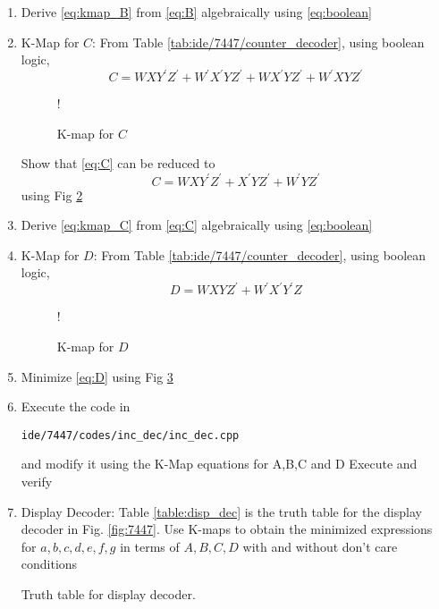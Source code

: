 \begin{enumerate}[label=\arabic*.,ref=\theenumi]
\begin{equation}
\end{equation}
%
\begin{figure}[H]
\resizebox {\columnwidth} {!} {

}
\caption{K-map for $B$}
\label{fig:kmap_B}
\end{figure}
%
Show that \eqref{eq:B} can be reduced to
\begin{equation}
\label{eq:kmap_B}
B = WX^{\prime}Z^{\prime} + W^{\prime}XZ^{\prime}
\end{equation}
using Fig \ref{fig:kmap_B}
\item Derive \eqref{eq:kmap_B} from \eqref{eq:B} algebraically using \eqref{eq:boolean}
%
%
\item {K-Map for $C$: }
From Table \ref{tab:ide/7447/counter_decoder}, using boolean logic,
\begin{equation}
\label{eq:C}
C = WXY^{\prime}Z^{\prime} + W^{\prime}X^{\prime}YZ^{\prime}
+WX^{\prime}YZ^{\prime}
+W^{\prime}XYZ^{\prime}
\end{equation}
%
%
\begin{figure}[H]
\resizebox {\columnwidth} {!} {

}
\caption{K-map for $C$}
\label{fig:kmap_C}
\end{figure}
%
Show that \eqref{eq:C} can be reduced to
\begin{equation}
\label{eq:kmap_C}
C = WXY^{\prime}Z^{\prime}  +  X^{\prime}YZ^{\prime} + W^{\prime}YZ^{\prime}
\end{equation}
using Fig \ref{fig:kmap_C}
%
\item 
Derive \eqref{eq:kmap_C} from \eqref{eq:C} algebraically using \eqref{eq:boolean}
%
\item {K-Map for $D$: }
From Table \ref{tab:ide/7447/counter_decoder}, using boolean logic,
\begin{equation}
\label{eq:D}
D = WXYZ^{\prime} + W^{\prime}X^{\prime}Y^{\prime}Z
\end{equation}
%
\begin{figure}[H]
\resizebox {\columnwidth} {!} {

}
\caption{K-map for $D$}
\label{fig:kmap_D}
\end{figure}
%
\item 
Minimize \eqref{eq:D} using Fig \ref{fig:kmap_D}
%
\item Execute the code in
\begin{lstlisting}
ide/7447/codes/inc_dec/inc_dec.cpp
\end{lstlisting}
%
and modify it using the K-Map equations for A,B,C and D Execute and verify
\item {Display Decoder:}
Table \ref{table:disp_dec} is the truth table for the display decoder in Fig.
\ref{fig:7447}.
Use K-maps to obtain the minimized expressions for $a,b,c,d,e,f,g$ in terms of $A,B,C,D$ with and without don't care conditions
%
\begin{table*}[!ht]
	\centering

\caption{Truth table for display decoder.}
\label{table:disp_dec}
\end{table*}
\end{enumerate}

